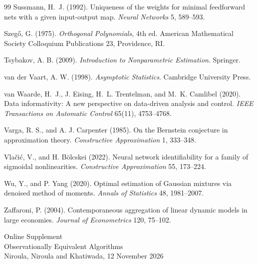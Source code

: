 \documentclass[12pt]{article}
\theoremstyle{definition}
\theoremstyle{remark}
\begin{document}
\begin{thebibliography}{99}
 Sussmann, H.~J. (1992). Uniqueness of the weights for minimal feedforward nets with a given input-output map. \emph{Neural Networks} 5, 589--593.

 Szeg\H{o}, G. (1975). \emph{Orthogonal Polynomials}, 4th ed. American Mathematical Society Colloquium Publications 23, Providence, RI.

 Tsybakov, A. B. (2009). \emph{Introduction to Nonparametric Estimation}. Springer.

 van der Vaart, A. W. (1998). \emph{Asymptotic Statistics}. Cambridge University Press.

 van Waarde, H.~J., J. Eising, H.~L. Trentelman, and M.~K. Camlibel (2020). Data informativity: A new perspective on data-driven analysis and control. \emph{IEEE Transactions on Automatic Control} 65(11), 4753--4768.

 Varga, R. S., and A. J. Carpenter (1985). On the Bernstein conjecture in approximation theory. \emph{Constructive Approximation} 1, 333--348.

 Vla\v{c}i\'c, V., and H. B\"olcskei (2022). Neural network identifiability for a family of sigmoidal nonlinearities. \emph{Constructive Approximation} 55, 173--224.

 Wu, Y., and P. Yang (2020). Optimal estimation of Gaussian mixtures via denoised method of moments. \emph{Annals of Statistics} 48, 1981--2007.

 Zaffaroni, P. (2004). Contemporaneous aggregation of linear dynamic models in large economies. \emph{Journal of Econometrics} 120, 75--102.

\end{thebibliography}
\appendix
\clearpage
\singlespacing\small\sloppy
\renewcommand{\topfraction}{0.9}\renewcommand{\bottomfraction}{0.8}\renewcommand{\textfraction}{0.07}\renewcommand{\floatpagefraction}{0.75}
\setcounter{page}{1}\setcounter{table}{0}\setcounter{figure}{0}
\begin{center}{\Large Online Supplement}\\[4pt]{\large Observationally Equivalent Algorithms}\\[2pt]{\normalsize Niroula, Niroula and Khatiwada, 12 November 2026}\end{center}
\end{document}
